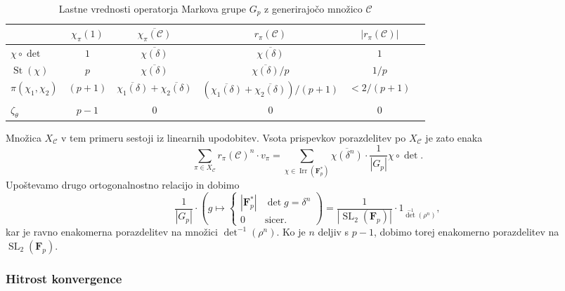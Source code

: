 \documentclass[11pt]{book}
\def\conclass{\mathcal{C}}
\def\FF{\mathbf{F}}
\DeclareMathOperator\Irr{Irr}
\DeclareMathOperator\St{St}
\DeclareMathOperator\SL{SL}
\theoremstyle{definition}
\theoremstyle{zgled}
\theoremstyle{odprtproblem}
\theoremstyle{domacanaloga}
\theoremstyle{izrek}
\begin{document}
\begin{table}[ht]
    \centering
    \small
\begin{tabular}{l|*{5}{c}}
    & 
    $\chi_{\pi}(1)$
    &
    $\overline{\chi_{\pi}(\conclass)}$
    &
    $r_{\pi}(\conclass)$
    &
    $\left| r_{\pi}(\conclass) \right|$ \\ \hline
    $\chi \circ \det$ & $1$ & $\overline{\chi(\delta)}$ &  $\overline{\chi(\delta)}$ & $1$ \\
    $\St(\chi)$ & $p$ & $\overline{\chi(\delta)}$ & $\overline{\chi(\delta)} / p$ & $1/p$ \\
    $\pi(\chi_1, \chi_2)$ & $(p+1)$ & $\overline{\chi_1(\delta)} + \overline{\chi_2(\delta)}$ & $(\overline{\chi_1(\delta)} + \overline{\chi_2(\delta)})/(p+1)$ & $< 2/(p+1)$ \\
    $\zeta_{\theta}$ & $p-1$ & $0$ & $0$ & $0$ \\
\end{tabular}
\caption{Lastne vrednosti operatorja Markova grupe $G_p$ z generirajočo množico $\conclass$}
\end{table}

Množica $X_{\conclass}$ v tem primeru sestoji iz linearnih upodobitev. Vsota prispevkov porazdelitev po $X_{\conclass}$ je zato enaka
\[
    \sum_{\pi \in X_{\conclass}} r_{\pi}(\conclass)^n \cdot v_{\pi}
    = \sum_{\chi \in \Irr(\FF_p^*)} \overline{\chi(\delta^{n})} \cdot \frac{1}{|G_p|} \chi \circ \det.
\]
Upoštevamo drugo ortogonalnostno relacijo in dobimo
\[
    \frac{1}{|G_p|} \cdot \left( g \mapsto \begin{cases}
        |\FF_p^*| & \det g = \delta^n \\
        0 & \text{sicer.}
    \end{cases}
    \right)    
    = \frac{1}{|\SL_2(\FF_p)|} \cdot 1_{\det^{-1}(\rho^n)},
\]
kar je ravno enakomerna porazdelitev na množici $\det^{-1}(\rho^n)$. Ko je $n$ deljiv s $p-1$, dobimo torej enakomerno porazdelitev na $\SL_2(\FF_p)$.

\subsubsection{Hitrost konvergence}
\end{document}
